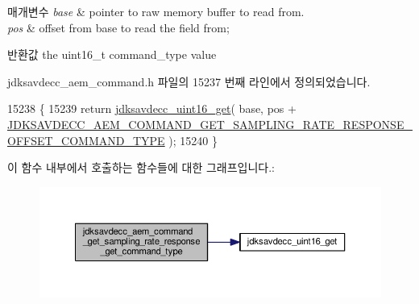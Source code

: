 \begin{DoxyParams}{매개변수}
{\em base} & pointer to raw memory buffer to read from. \\
\hline
{\em pos} & offset from base to read the field from; \\
\hline
\end{DoxyParams}
\begin{DoxyReturn}{반환값}
the uint16\+\_\+t command\+\_\+type value 
\end{DoxyReturn}


jdksavdecc\+\_\+aem\+\_\+command.\+h 파일의 15237 번째 라인에서 정의되었습니다.


\begin{DoxyCode}
15238 \{
15239     \textcolor{keywordflow}{return} \hyperlink{group__endian_ga3fbbbc20be954aa61e039872965b0dc9}{jdksavdecc\_uint16\_get}( base, pos + 
      \hyperlink{group__command__get__sampling__rate__response_ga4d7127c0b71b0536657fb14ae59e3ad2}{JDKSAVDECC\_AEM\_COMMAND\_GET\_SAMPLING\_RATE\_RESPONSE\_OFFSET\_COMMAND\_TYPE}
       );
15240 \}
\end{DoxyCode}


이 함수 내부에서 호출하는 함수들에 대한 그래프입니다.\+:
\nopagebreak
\begin{figure}[H]
\begin{center}
\leavevmode
\includegraphics[width=350pt]{group__command__get__sampling__rate__response_ga38baf13e3649a8755022dfb02af42a7b_cgraph}
\end{center}
\end{figure}


